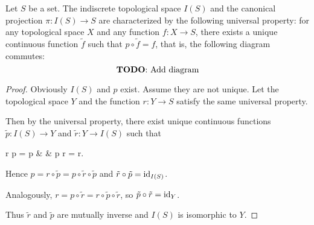 \begin{example}\label{ex:indiscrete_topology_universal_property}
  Let \( S \) be a set. The indiscrete topological space \( I(S) \) and the canonical projection \( \pi: I(S) \to S \) are characterized by the following universal property: for any topological space \( X \) and any function \( f: X \to S \), there exists a unique continuous function \( \tilde f \) such that \( p \circ \tilde f = f \), that is, the following diagram commutes:
  \begin{equation*}
    \text{\todo{Add diagram}}\iffalse\begin{mplibcode}
      beginfig(1);
      input metapost/graphs;

      v1 := thelabel("$S$", origin);
      v2 := thelabel("$I(S)$", (2, 0) scaled u);
      v3 := thelabel("$X$", (1, -1) scaled u);

      a1 := straight_arc(v2, v1);
      a2 := straight_arc(v3, v1);

      d1 := straight_arc(v3, v2);

      draw_vertices(v);
      draw_arcs(a);

      draw d1 dotted;

      label.top("$p$", straight_arc_midpoint of a1);
      label.llft("$f$", straight_arc_midpoint of a2);
      label.lrt("$\hat f$", straight_arc_midpoint of d1);
      endfig;
    \end{mplibcode}\fi
  \end{equation*}
\end{example}
\begin{proof}
  Obviously \( I(S) \) and \( p \) exist. Assume they are not unique. Let the topological space \( Y \) and the function \( r: Y \to S \) satisfy the same universal property.

  Then by the universal property, there exist unique continuous functions \( \tilde p: I(S) \to Y \) and \( \tilde r: Y \to I(S) \) such that
  \begin{balign*}
    r \circ \tilde p = p
     &  &
    p \circ \tilde r = r.
  \end{balign*}

  Hence \( p = r \circ \tilde p = p \circ \tilde r \circ \tilde p \) and \( \tilde r \circ \tilde p = \operatorname{id}_{I(S)} \).

  Analogously, \( r = p \circ \tilde r = r \circ \tilde p \circ \tilde r \), so \( \tilde p \circ \tilde r = \operatorname{id}_Y \).

  Thus \( \tilde r \) and \( \tilde p \) are mutually inverse and \( I(S) \) is isomorphic to \( Y \).
\end{proof}

